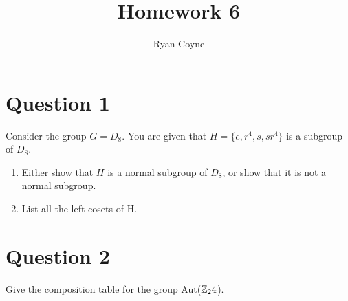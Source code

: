 \documentclass[12pt]{article}
\title{Homework 6}
\author{Ryan Coyne}
\begin{document}
\maketitle

\section*{Question 1}
    Consider the group \(G = D_8\). You are given that \(H = \{e , r^4, s, sr^4\}\) is a subgroup of \(D_8\).
    \begin{enumerate}[label=\alph*)]
        \item Either show that \(H\) is a normal subgroup of \(D_8\), or show that it is not a normal subgroup.
        \item List all the left cosets of H.
    \end{enumerate}

    \section*{Question 2}
    Give the composition table for the group Aut(\(\mathbb{Z}_24\)).
\end{document}
